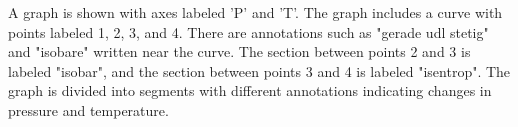 A graph is shown with axes labeled 'P' and 'T'. The graph includes a curve with points labeled 1, 2, 3, and 4. There are annotations such as "gerade udl stetig" and "isobare" written near the curve. The section between points 2 and 3 is labeled "isobar", and the section between points 3 and 4 is labeled "isentrop". The graph is divided into segments with different annotations indicating changes in pressure and temperature.
